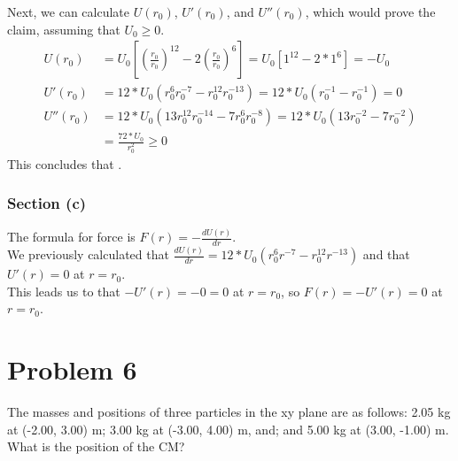 \documentclass[12pt]{article}
\begin{document}
\pagebreak
Next, we can calculate $U(r_0)$, $U'(r_0)$, and $U''(r_0)$, which would prove the claim, assuming that $ U_0 \ge 0 $. 
\begin{align*}
    U(r_0)  &=  U_0\left[ \left(\frac{r_0}{r_0}\right)^{12} - 2\left(\frac{r_0}{r_0}\right)^{6} \right]
        =   U_0\left[ 1^{12} - 2*1^{6} \right] = -U_0\\
    U'(r_0) &=  12 * U_0 \left( r_0^{6}r_0^{-7} - r_0^{12} r_0^{-13} \right)
        =   12 * U_0 \left( r_0^{-1} - r_0^{-1} \right)
        =   0\\
    U''(r_0)    &=  12 * U_0 \left( 13r_0^{12} r_0^{-14} - 7r_0^{6}r_0^{-8} \right)
        =   12 * U_0 \left( 13r_0^{-2} - 7r_0^{-2} \right)\\
        &=  \frac{72*U_0}{r_0^2} 
        \ge 0
\end{align*}
This concludes that .

\subsubsection*{Section (c)}
The formula for force is $ F(r) = -\frac{dU(r)}{dr} $. \\
We previously calculated that $ \frac{dU(r)}{dr} = 12 * U_0 \left( r_0^{6}r^{-7} - r_0^{12} r^{-13} \right) $ and that $ U'(r) = 0 $ at $ r = r_0 $. \\
This leads us to that $ -U'(r) = -0 = 0 $ at $ r = r_0 $, so $ F(r) = -U'(r) = 0 $ at $ r = r_0 $.


\pagebreak
\section*{Problem 6}
The masses and positions of three particles in the xy plane are as follows: 2.05 kg at (-2.00, 3.00) m; 3.00 kg at (-3.00, 4.00) m, and; and 5.00 kg at (3.00, -1.00) m. What is the position of the CM?
\end{document}
